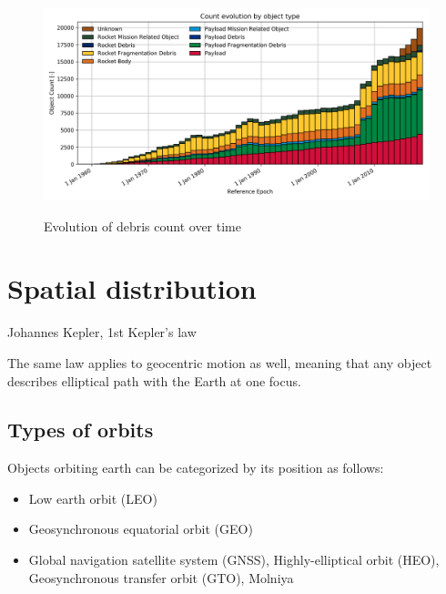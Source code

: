 \documentclass[12pt, a4paper, oneside]{book}
\begin{document}
\begin{figure}[!hbt]
    \begin{center}
        \includegraphics[scale=0.60]{images/debris_count.png}
        \label{img:debris_count}
        \caption{Evolution of debris count over time \cite{esa_about_space_debris}}
    \end{center}
\end{figure}


\section{Spatial distribution}

\begin{flushright}
    Johannes Kepler, 1st Kepler's law
\end{flushright}
The same law applies to geocentric motion as well, meaning that any object describes elliptical path with the Earth at one focus.
\\

\subsection{Types of orbits}

Objects orbiting earth can be categorized by its position as follows:
\begin{itemize}
    \item{Low earth orbit (LEO)}
    \item{Geosynchronous equatorial orbit (GEO)}
    \item{Global navigation satellite system (GNSS), Highly-elliptical orbit (HEO), Geosynchronous transfer orbit (GTO), Molniya}
\end{itemize}
\end{document}
